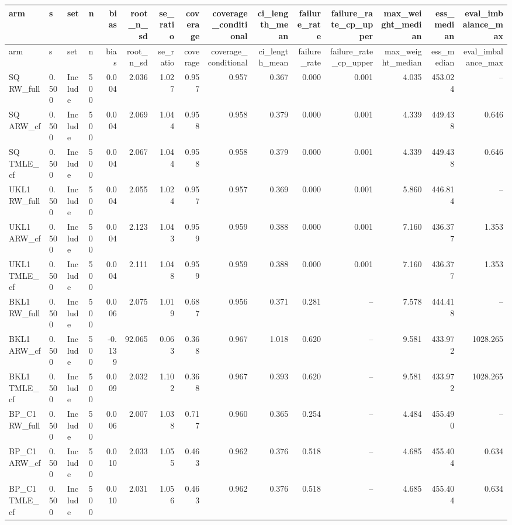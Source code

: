 \begin{tabular}{llllrrrrrrrrrrr}
\hline
arm & s & set & n & bias & root\_n\_sd & se\_ratio & coverage & coverage\_conditional & ci\_length\_mean & failure\_rate & failure\_rate\_cp\_upper & max\_weight\_median & ess\_median & eval\_imbalance\_max \\
\hline
\endfirsthead
\hline
arm & s & set & n & bias & root\_n\_sd & se\_ratio & coverage & coverage\_conditional & ci\_length\_mean & failure\_rate & failure\_rate\_cp\_upper & max\_weight\_median & ess\_median & eval\_imbalance\_max \\
\hline
\endhead
SQ RW\_full & 0.500 & Include & 500 & 0.004 & 2.036 & 1.027 & 0.957 & 0.957 & 0.367 & 0.000 & 0.001 & 4.035 & 453.024 & -- \\
SQ ARW\_cf & 0.500 & Include & 500 & 0.004 & 2.069 & 1.044 & 0.958 & 0.958 & 0.379 & 0.000 & 0.001 & 4.339 & 449.438 & 0.646 \\
SQ TMLE\_cf & 0.500 & Include & 500 & 0.004 & 2.067 & 1.044 & 0.958 & 0.958 & 0.379 & 0.000 & 0.001 & 4.339 & 449.438 & 0.646 \\
UKL1 RW\_full & 0.500 & Include & 500 & 0.004 & 2.055 & 1.024 & 0.957 & 0.957 & 0.369 & 0.000 & 0.001 & 5.860 & 446.814 & -- \\
UKL1 ARW\_cf & 0.500 & Include & 500 & 0.004 & 2.123 & 1.043 & 0.959 & 0.959 & 0.388 & 0.000 & 0.001 & 7.160 & 436.377 & 1.353 \\
UKL1 TMLE\_cf & 0.500 & Include & 500 & 0.004 & 2.111 & 1.048 & 0.959 & 0.959 & 0.388 & 0.000 & 0.001 & 7.160 & 436.377 & 1.353 \\
BKL1 RW\_full & 0.500 & Include & 500 & 0.006 & 2.075 & 1.019 & 0.687 & 0.956 & 0.371 & 0.281 & -- & 7.578 & 444.418 & -- \\
BKL1 ARW\_cf & 0.500 & Include & 500 & -0.139 & 92.065 & 0.063 & 0.368 & 0.967 & 1.018 & 0.620 & -- & 9.581 & 433.972 & 1028.265 \\
BKL1 TMLE\_cf & 0.500 & Include & 500 & 0.009 & 2.032 & 1.102 & 0.368 & 0.967 & 0.393 & 0.620 & -- & 9.581 & 433.972 & 1028.265 \\
BP\_C1 RW\_full & 0.500 & Include & 500 & 0.006 & 2.007 & 1.038 & 0.717 & 0.960 & 0.365 & 0.254 & -- & 4.484 & 455.490 & -- \\
BP\_C1 ARW\_cf & 0.500 & Include & 500 & 0.010 & 2.033 & 1.055 & 0.463 & 0.962 & 0.376 & 0.518 & -- & 4.685 & 455.404 & 0.634 \\
BP\_C1 TMLE\_cf & 0.500 & Include & 500 & 0.010 & 2.031 & 1.056 & 0.463 & 0.962 & 0.376 & 0.518 & -- & 4.685 & 455.404 & 0.634 \\

\end{tabular}
